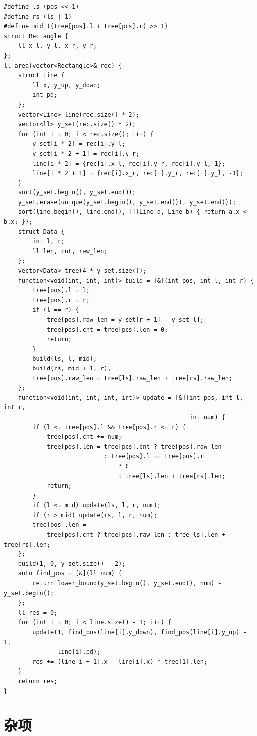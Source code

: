 \documentclass[UTF8]{ctexart}
\begin{document}
\begin{sloppypar}
\begin{lstlisting}[style=cpp]
#define ls (pos << 1)
#define rs (ls | 1)
#define mid ((tree[pos].l + tree[pos].r) >> 1)
struct Rectangle {
    ll x_l, y_l, x_r, y_r;
};
ll area(vector<Rectangle>& rec) {
    struct Line {
        ll x, y_up, y_down;
        int pd;
    };
    vector<Line> line(rec.size() * 2);
    vector<ll> y_set(rec.size() * 2);
    for (int i = 0; i < rec.size(); i++) {
        y_set[i * 2] = rec[i].y_l;
        y_set[i * 2 + 1] = rec[i].y_r;
        line[i * 2] = {rec[i].x_l, rec[i].y_r, rec[i].y_l, 1};
        line[i * 2 + 1] = {rec[i].x_r, rec[i].y_r, rec[i].y_l, -1};
    }
    sort(y_set.begin(), y_set.end());
    y_set.erase(unique(y_set.begin(), y_set.end()), y_set.end());
    sort(line.begin(), line.end(), [](Line a, Line b) { return a.x < b.x; });
    struct Data {
        int l, r;
        ll len, cnt, raw_len;
    };
    vector<Data> tree(4 * y_set.size());
    function<void(int, int, int)> build = [&](int pos, int l, int r) {
        tree[pos].l = l;
        tree[pos].r = r;
        if (l == r) {
            tree[pos].raw_len = y_set[r + 1] - y_set[l];
            tree[pos].cnt = tree[pos].len = 0;
            return;
        }
        build(ls, l, mid);
        build(rs, mid + 1, r);
        tree[pos].raw_len = tree[ls].raw_len + tree[rs].raw_len;
    };
    function<void(int, int, int, int)> update = [&](int pos, int l, int r,
                                                    int num) {
        if (l <= tree[pos].l && tree[pos].r <= r) {
            tree[pos].cnt += num;
            tree[pos].len = tree[pos].cnt ? tree[pos].raw_len
                            : tree[pos].l == tree[pos].r
                                ? 0
                                : tree[ls].len + tree[rs].len;
            return;
        }
        if (l <= mid) update(ls, l, r, num);
        if (r > mid) update(rs, l, r, num);
        tree[pos].len =
            tree[pos].cnt ? tree[pos].raw_len : tree[ls].len + tree[rs].len;
    };
    build(1, 0, y_set.size() - 2);
    auto find_pos = [&](ll num) {
        return lower_bound(y_set.begin(), y_set.end(), num) - y_set.begin();
    };
    ll res = 0;
    for (int i = 0; i < line.size() - 1; i++) {
        update(1, find_pos(line[i].y_down), find_pos(line[i].y_up) - 1,
               line[i].pd);
        res += (line[i + 1].x - line[i].x) * tree[1].len;
    }
    return res;
}
\end{lstlisting}

\clearpage

\section{杂项}


\end{sloppypar}
\end{document}
